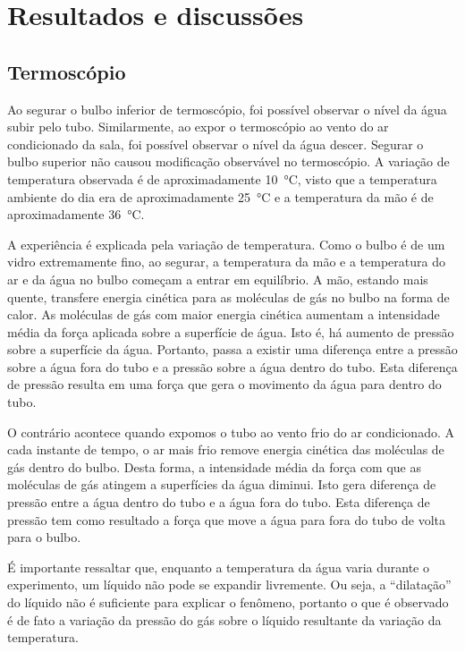 \section{Resultados e discussões}
\subsection{Termoscópio}

Ao segurar o bulbo inferior de termoscópio, foi possível observar o nível da água subir pelo tubo. Similarmente, ao expor o termoscópio ao vento do ar condicionado da sala, foi possível observar o nível da água descer. Segurar o bulbo superior não causou modificação observável no termoscópio. A variação de temperatura observada é de aproximadamente \qty{10}{\celsius}, visto que a temperatura ambiente do dia era de aproximadamente \qty{25}{\celsius} e a temperatura da mão é de aproximadamente \qty{36}{\celsius}.  

A experiência é explicada pela variação de temperatura. Como o bulbo é de um vidro extremamente fino, ao segurar, a temperatura da mão e a temperatura do ar e da água no bulbo começam a entrar em equilíbrio. A mão, estando mais quente, transfere energia cinética para as moléculas de gás no bulbo na forma de calor. As moléculas de gás com maior energia cinética aumentam a intensidade média da força aplicada sobre a superfície de água. Isto é, há aumento de pressão sobre a superfície da água. Portanto, passa a existir uma diferença entre a pressão sobre a água fora do tubo e a pressão sobre a água dentro do tubo. Esta diferença de pressão resulta em uma força que gera o movimento da água para dentro do tubo. 

O contrário acontece quando expomos o tubo ao vento frio do ar condicionado. A cada instante de tempo, o ar mais frio remove energia cinética das moléculas de gás dentro do bulbo. Desta forma, a intensidade média da força com que as moléculas de gás atingem a superfícies da água diminui. Isto gera diferença de pressão entre a água dentro do tubo e a água fora do tubo. Esta diferença de pressão  tem como resultado a força que move a água para fora do tubo de volta para o bulbo.

É importante ressaltar que, enquanto a temperatura da água varia durante o experimento, um líquido não pode se expandir livremente. Ou seja, a ``dilatação'' do líquido não é suficiente para explicar o fenômeno, portanto o que é observado é de fato a variação da pressão do gás sobre o líquido resultante da variação da temperatura. 

